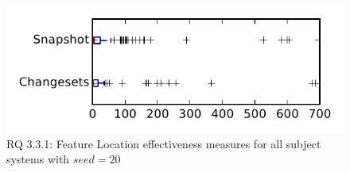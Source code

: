 
\begin{figure}
\centering
\includegraphics[height=0.4\textheight]{figures/flt_seed/rq1_tiny_20}
\caption{RQ 3.3.1: Feature Location effectiveness measures for all subject systems with $seed=20$}
\label{fig:flt_seed:rq1:tiny}
\end{figure}
